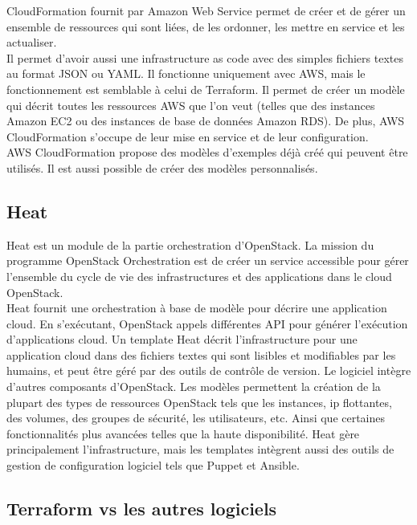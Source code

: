 \documentclass[]{article}
\begin{document}
CloudFormation fournit par Amazon Web Service permet de créer et de
gérer un ensemble de ressources qui sont liées, de les ordonner, les
mettre en service et les actualiser. \\
Il permet d'avoir aussi une infrastructure as code avec des simples fichiers textes au
format JSON ou YAML. Il fonctionne uniquement avec AWS, mais le
fonctionnement est semblable à celui de  Terraform. Il permet de créer un modèle qui
décrit toutes les ressources AWS que l'on veut (telles que des instances
Amazon EC2 ou des instances de base de données Amazon RDS). De plus, AWS
CloudFormation s'occupe de leur mise en service et de leur
configuration.\\
AWS CloudFormation propose des modèles d'exemples déjà
créé qui peuvent être utilisés. Il est aussi possible de créer des
modèles personnalisés.

\subsection{Heat}\label{heat}

Heat est un module de la partie orchestration d'OpenStack. La mission du
programme OpenStack Orchestration est de créer un service accessible
pour gérer l'ensemble du cycle de vie des infrastructures et des
applications dans le cloud OpenStack. \\
Heat fournit une orchestration à
base de modèle pour décrire une application cloud. En s'exécutant,
OpenStack appels différentes API pour générer l'exécution d'applications
cloud. Un template Heat décrit l'infrastructure pour une application
cloud dans des fichiers textes qui sont lisibles et modifiables par les
humains, et peut être géré par des outils de contrôle de version. Le
logiciel intègre d'autres composants d'OpenStack. Les modèles permettent
la création de la plupart des types de ressources OpenStack tels que les
instances, ip flottantes, des volumes, des groupes de sécurité, les
utilisateurs, etc. Ainsi que certaines fonctionnalités plus avancées
telles que la haute disponibilité. Heat gère principalement
l'infrastructure, mais les templates intègrent aussi des outils de
gestion de configuration logiciel tels que Puppet et Ansible.

\subsection{Terraform vs les autres
logiciels}\label{terraform-vs-les-autres-logiciels}
\end{document}
